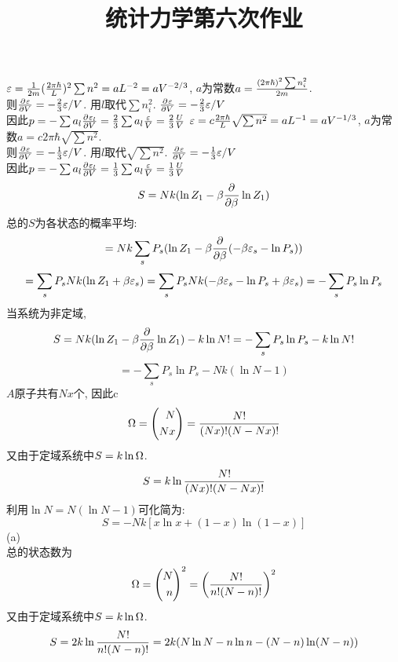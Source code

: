 \documentclass[UTF8,9pt]{ctexart}
\title{统计力学第六次作业}
\begin{document}
 
\maketitle
{}
$\varepsilon = \frac{1}{2m}(\frac{2\pi\hbar}{L})^2\sum n^2 = aL^{-2} = aV^{-2/3}$, $a$为常数$a=\frac{(2\pi\hbar)^2\sum n_i^2}{2m}$. \\
则$\frac{\partial^{} \varepsilon}{\partial {V}^{}} = -\frac{2}{3}\varepsilon/V$. 用$l$取代$\sum n_i^2$. $\frac{\partial^{} \varepsilon}{\partial {V}^{}} =  -\frac{2}{3}\varepsilon/V$\\
因此$p=-\sum a_l\frac{\partial^{} \varepsilon_l}{\partial {V}^{}} = \frac{2}{3}\sum a_l \frac{\varepsilon}{V} = \frac{2}{3}\frac{U}{V}$
$\varepsilon = c\frac{2\pi\hbar}{L}\sqrt{\sum n^2} = aL^{-1} = aV^{-1/3}$, $a$为常数$a=c2\pi\hbar\sqrt{\sum n^2}$. \\
则$\frac{\partial^{} \varepsilon}{\partial {V}^{}} = -\frac{1}{3}\varepsilon/V$. 用$l$取代$\sqrt{\sum n^2}$. $\frac{\partial^{} \varepsilon}{\partial {V}^{}} =  -\frac{1}{3}\varepsilon/V$\\
因此$p=-\sum a_l\frac{\partial^{} \varepsilon_l}{\partial {V}^{}} = \frac{1}{3}\sum a_l \frac{\varepsilon}{V} = \frac{1}{3}\frac{U}{V}$
$$S = Nk(\ln Z_1-\beta\frac{\partial^{} }{\partial {\beta}^{}}\ln Z_1) $$
总的$S$为各状态的概率平均:
$$= Nk\sum_s P_s(\ln Z_1-\beta\frac{\partial^{} }{\partial {\beta}^{}}(-\beta\varepsilon_s-\ln P_s))$$
$$=\sum_s P_sNk(\ln Z_1+\beta\varepsilon_s) = \sum_s P_sNk(-\beta\varepsilon_s-\ln P_s+\beta\varepsilon_s) = -\sum_s P_s\ln P_s$$
当系统为非定域, $$S = Nk(\ln Z_1-\beta\frac{\partial^{} }{\partial {\beta}^{}}\ln Z_1) -k\ln N! = -\sum_s P_s\ln P_s -k\ln N! $$
$$= -\sum_s P_s\ln P_s -Nk(\ln N-1)$$ 
$A$原子共有$Nx$个, 因此c
$$\Omega = \left( \begin{aligned} N\\Nx \end{aligned} \right) = \frac{N!}{(Nx)! (N-Nx)!}$$%
又由于定域系统中$S=k\ln\Omega$.
$$S=k\ln\frac{N!}{(Nx)! (N-Nx)!}$$
利用$\ln N =N(\ln N-1)$可化简为:
$$S = -Nk[x\ln x+(1-x)\ln(1-x)]$$
(a)\\
总的状态数为
$$\Omega = \left( \begin{aligned} N\\n \end{aligned} \right)^2= \left( \frac{N!}{n! (N-n)!} \right)^2$$
又由于定域系统中$S=k\ln\Omega$.
$$S=2k\ln\frac{N!}{n! (N-n)!} = 2k(N\ln N-n\ln n-(N-n)\ln (N-n))$$
\end{document}
